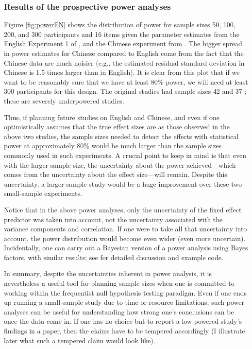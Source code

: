 \documentclass{ar-1col}\usepackage[]{graphicx}\usepackage[]{color}
\begin{document}
\subsubsection{Results of the prospective power analyses}

Figure \ref{fig:powerEN} shows the distribution of power for sample sizes 50, 100, 200, and 300 participants and 16 items given the parameter estimates from the English Experiment 1 of \citet{grodner}, and the Chinese experiment from \citet{gibsonwu}. The bigger spread in power estimates for Chinese compared to English come from the fact that the Chinese data are much noisier (e.g., the estimated residual standard deviation in Chinese is 1.5 times larger than in English). It is clear from this plot that if we want to be reasonably sure that we have at least 80\% power, we will need at least 300 participants for this design. The original studies had sample sizes 42 and 37 \citep[][respectively]{grodner,gibsonwu}; these are severely underpowered studies. 

Thus, if planning future studies on English and Chinese, and even if one optimistically assumes that the true effect sizes are as those observed in the above two studies, the sample sizes needed to detect the effects with statistical power at approximately 80\% would be much larger than the sample sizes commonly used in such experiments.  A crucial point to keep in mind is that even with the larger sample size, the uncertainty about the power achieved---which comes from the uncertainty about the effect size---will remain. Despite this uncertainty, a larger-sample study would be a huge improvement over these two small-sample experiments.

Notice that in the above power analyses, only the uncertainty of the fixed effect predictor was taken into account, not the uncertainty associated with the variance components and correlation. If one were to take all that uncertainty into account, the power distribution would become even wider (even more uncertain). Incidentally, one can carry out a Bayesian version of a power analysis using Bayes factors, with similar results; see \citet{vasishth2021sample} for detailed discussion and example code.

In summary, despite the uncertainties inherent in power analysis, it is nevertheless a useful tool for planning sample sizes when one is committed to working within the frequentist null hypothesis testing paradigm. Even if one ends up running a small-sample study due to time or resource limitations, such power analyses can be useful for understanding how strong one's conclusions can be once the data come in. If one has no choice but to report a low-powered study's findings in a paper, then the claims have to be tempered accordingly (I illustrate later what such a tempered claim would look like). 
\end{document}
